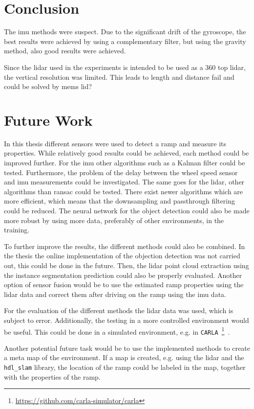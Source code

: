 \section{Conclusion}
The \gls{imu} methods were suspect.
Due to the significant drift of the gyroscope, the best results were achieved by using a complementary filter, but using the gravity method, also good results were achieved.

Since the \gls{lidar} used in the experiments is intended to be used as a 360 top \gls{lidar}, the vertical resolution was limited.
This leads to length and distance fail and could be solved by mems lid?



\section{Future Work}
In this thesis different sensors were used to detect a ramp and measure its properties.
While relatively good results could be achieved, each method could be improved further.
For the \gls{imu} other algorithms such as a Kalman filter could be tested.
Furthermore, the problem of the delay between the wheel speed sensor and \gls{imu} measurements could be investigated.
The same goes for the \gls{lidar}, other algorithms than \gls{ransac} could be tested.
There exist newer algorithms which are more efficient, which means that the downsampling and passthrough filtering could be reduced.
The neural network for the object detection could also be made more robust by using more data, preferably of other environments, in the training.

To further improve the results, the different methods could also be combined.
In the thesis the online implementation of the objection detection was not carried out, this could be done in the future.
Then, the \gls{lidar} point cloud extraction using the instance segmentation prediction could also be properly evaluated.
Another option of sensor fusion would be to use the estimated ramp properties using the \gls{lidar} data and correct them after driving on the ramp using the \gls{imu} data.

For the evaluation of the different methods the \gls{lidar} data was used, which is subject to error.
Additionally, the testing in a more controlled environment would be useful.
This could be done in a simulated environment, e.g. in \texttt{CARLA}~\footnote{\url{https://github.com/carla-simulator/carla}}~\cite{Dosovitskiy2017}.

Another potential future task would be to use the implemented methods to create a meta map of the environment.
If a map is created, e.g. using the \gls{lidar} and the \texttt{hdl\_slam} library, the location of the ramp could be labeled in the map, together with the properties of the ramp.



